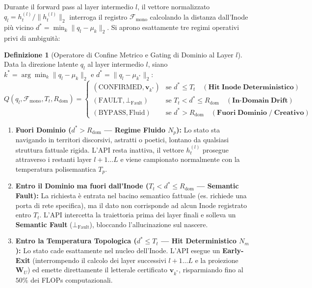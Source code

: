 \documentclass[11pt,a4paper]{article}
\theoremstyle{definition}
\newtheorem{definizione}{Definizione}
\begin{document}
Durante il forward pass al layer intermedio $l$, il vettore normalizzato $q_l = h_t^{(l)} / \|h_t^{(l)}\|_2$ interroga il registro $\mathcal{F}_{\mathrm{mono}}$ calcolando la distanza dall'Inode più vicino $d^* = \min_k \|q_l - \mu_k\|_2$. Si aprono esattamente tre regimi operativi privi di ambiguità:

\begin{definizione}[Operatore di Confine Metrico e Gating di Dominio al Layer $l$]
Data la direzione latente $q_l$ al layer intermedio $l$, siano $k^* = \arg\min_k \|q_l - \mu_k\|_2$ e $d^* = \|q_l - \mu_{k^*}\|_2$:
{\small
\begin{equation}
    Q(q_l, \mathcal{F}_{\mathrm{mono}}, T_t, R_{\mathrm{dom}}) = 
    \begin{cases} 
      (\mathrm{CONFIRMED}, \mathbf{v}_{k^*}) & \text{se } d^* \le T_t \quad (\mathbf{Hit\;Inode\;Deterministico}) \\ 
      (\mathrm{FAULT}, \bot_{\mathrm{Fault}}) & \text{se } T_t < d^* \le R_{\mathrm{dom}} \quad (\mathbf{In\text{-}Domain\;Drift}) \\
      (\mathrm{BYPASS}, \mathrm{Fluid}) & \text{se } d^* > R_{\mathrm{dom}} \quad (\mathbf{Fuori\;Dominio\;/\;Creativo})
    \end{cases}
\end{equation}
}
\end{definizione}

\begin{enumerate}[leftmargin=*, itemsep=2.5pt]
    \item \textbf{Fuori Dominio ($d^* > R_{\mathrm{dom}}$ --- Regime Fluido $N_p$):} Lo stato sta navigando in territori discorsivi, astratti o poetici, lontano da qualsiasi struttura fattuale rigida. L'API resta inattiva, il vettore $h_t^{(l)}$ prosegue attraverso i restanti layer $l+1 \dots L$ e viene campionato normalmente con la temperatura polisemantica $T_p$.
    \item \textbf{Entro il Dominio ma fuori dall'Inode ($T_t < d^* \le R_{\mathrm{dom}}$ --- Semantic Fault):} La richiesta è entrata nel bacino semantico fattuale (es. richiede una porta di rete specifica), ma il dato non corrisponde ad alcun Inode registrato entro $T_t$. L'API intercetta la traiettoria prima dei layer finali e solleva un \textbf{Semantic Fault} ($\bot_{\mathrm{Fault}}$), bloccando l'allucinazione sul nascere.
    \item \textbf{Entro la Temperatura Topologica ($d^* \le T_t$ --- Hit Deterministico $N_m$):} Lo stato cade esattamente nel nucleo dell'Inode. L'API esegue un \textbf{Early-Exit} (interrompendo il calcolo dei layer successivi $l+1 \dots L$ e la proiezione $\mathbf{W}_U$) ed emette direttamente il letterale certificato $\mathbf{v}_{k^*}$, risparmiando fino al $50\%$ dei FLOPs computazionali.
\end{enumerate}
\end{document}
